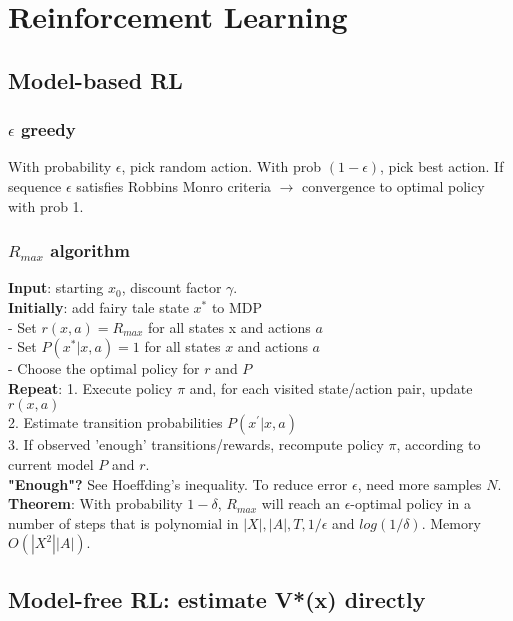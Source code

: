 \section{Reinforcement Learning}

\subsection{Model-based RL}

\subsubsection{$\epsilon$ greedy}
With probability $\epsilon$, pick random action. With prob $(1-\epsilon)$, pick best action. If sequence $\epsilon$ satisfies Robbins Monro criteria $\rightarrow$ convergence to optimal policy with prob 1.

\subsubsection{$R_{max}$ algorithm}
\textbf{Input}: starting $x_0$, discount factor $\gamma$.\\
\textbf{Initially}: add fairy tale state $x^*$ to MDP\\
- Set $r(x,a)=R_{max}$ for all states x and actions $a$\\
- Set $P(x^*|x,a)=1$ for all states $x$ and actions $a$\\
- Choose the optimal policy for $r$ and $P$\\
\textbf{Repeat}:
1. Execute policy $\pi$ and, for each visited state/action pair, update $r(x,a)$\\
2. Estimate transition probabilities $P(x^{'}|x,a)$\\
3. If observed 'enough' transitions/rewards, recompute policy $\pi$, according to current model $P$ and $r$.\\
\textbf{"Enough"?} See Hoeffding's inequality. To reduce error $\epsilon$, need more samples $N$.\\
\textbf{Theorem}: With probability $1-\delta$, $R_{max}$ will reach an $\epsilon$-optimal policy in a number of steps that is polynomial in $|X|, |A|, T, 1/\epsilon$ and $log(1/\delta)$. Memory $O(|X^2||A|)$. 

\subsection{Model-free RL: estimate V*(x) directly}
